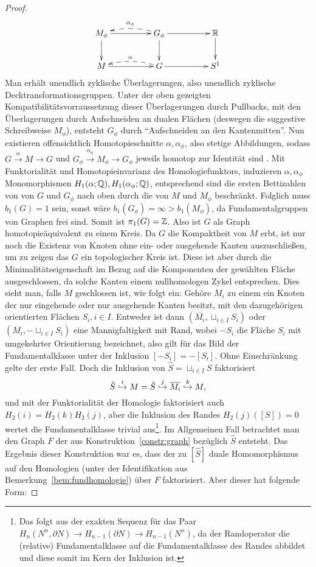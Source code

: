 \begin{proof}
	\[
	 	\begin{xy}
	 		\xymatrixcolsep{4pc}\xymatrix{
	 			M_\phi \ar[r] \ar[d] & G_\phi \ar[d] \ar@{-->}@/_/[l]_{\alpha_\phi} \ar[r] & \RR \ar[d]\\
	 			M \ar[r] & G \ar@{-->}@/_/[l]_\alpha \ar[r] &S^1
	 		}
	 	\end{xy}
	 \] 
	 Man erhält unendlich zyklische Überlagerungen, also unendlich zyklische Decktransformationsgruppen. Unter der oben gezeigten Kompatibilitätsvorraussetzung dieser Überlagerungen durch Pullbacks, mit den Überlagerungen durch Aufschneiden an dualen Flächen (deswegen die suggestive Schreibweise $M_\phi$), entsteht $G_\phi$ durch "`Aufschneiden an den Kantenmitten"'. Nun existieren offensichtlich Homotopieschnitte $\alpha, \alpha_\phi$, also stetige Abbildungen, sodass $ G \stackrel \alpha \to M \to G$ und $ G_\phi \stackrel {\alpha_ \phi} \to M_\phi \to G_\phi$ jeweils homotop zur Identität sind . Mit Funktorialität und Homotopieinvarianz des Homologiefunktors, induzieren $\alpha,\alpha_\phi$ Monomorphismen $H_1(\alpha;\mathbb{Q}),H_1(\alpha_\phi;\mathbb{Q})$, entsprechend sind die ersten Bettizahlen von von $G$ und $G_\phi$ nach oben durch die von $M$ und $M_\phi$ beschränkt. Folglich muss $b_1(G)=1$ sein, sonst wäre $b_1(G_\phi)=\infty> b_1(M_\phi)$, da Fundamentalgruppen von Graphen frei sind. Somit ist $\pi_1(G)= \mathbb{Z}$. Also ist $G$ als Graph homotopieäquivalent zu einem Kreis. Da $G$ die Kompaktheit von $M$ erbt, ist nur noch die Existenz von Knoten ohne ein- oder ausgehende Kanten auszuschließen, um zu zeigen das $G$ ein topologischer Kreis ist. Diese ist aber durch die Minimalitätseigenschaft im Bezug auf die Komponenten der gewählten Fläche ausgeschlossen, da solche Kanten einem nullhomologen Zykel entsprechen. Dies sieht man, falls $M$ geschlossen ist, wie folgt ein: Gehöre $M_i$ zu einem ein Knoten der nur eingehende oder nur ausgehende Kanten besitzt, mit den dazugehörigen orientierten Flächen $S_i, i \in I$. Entweder ist dann $(\overline{M_i},\sqcup_{i\in I}S_i)$ oder $(\overline{M_i},-\sqcup_{i\in I}S_i)$ eine Mannigfaltigkeit mit Rand, wobei $-S_i$ die Fläche $S_i$ mit umgekehrter Orientierung bezeichnet, also gilt für das Bild der Fundamentalklasse unter der Inklusion $[-S_i]=-[S_i]$. Ohne Einschränkung gelte der erste Fall. Doch die Inklusion von $\hat S = \sqcup_{i \in I} S$ faktorisiert 
	 \[
	  \hat S \stackrel i {\hookrightarrow} M = \hat S \stackrel j {\hookrightarrow} \overline{M_i} \stackrel k {\hookrightarrow} M,	 	
	 \]
	 und mit der Funktorialität der Homologie faktorisiert auch $H_2(i)=H_2(k)H_2(j)$, aber die Inklusion des Randes $H_2(j)([S])=0$ wertet die Fundamentalklasse trivial aus\footnote{Das folgt aus der exakten Sequenz für das Paar $H_n(N^n, \partial N) \to H_{n-1}(\partial N) \to H_{n-1}(N^n)$, da der Randoperator die (relative) Fundamentalklasse auf die Fundamentalklasse des Randes abbildet und diese somit im Kern der Inklusion ist.}. Im Allgemeinen Fall betrachtet man den Graph $F$ der aus Konstruktion~\ref{constr:graph} bezüglich $\hat S$ entsteht. Das Ergebnis dieser Konstruktion war es, dass der zu $[\hat S]$ duale Homomorphismus auf den Homologien (unter der Identifikation aus Bemerkung~\ref{bem:fundhomologie}) über $F$ faktorisiert. Aber dieser hat folgende Form:

\end{proof}
